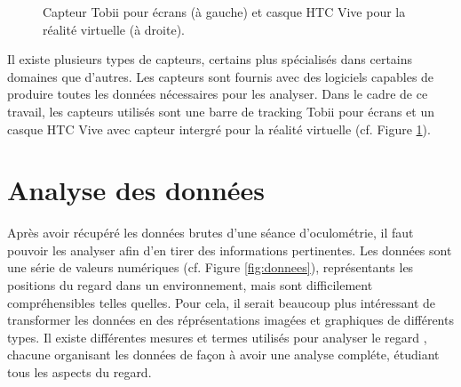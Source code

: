 \documentclass[12pt]{article}
\begin{document}
\begin{figure}[htpb]
  \centering
  \qquad
  \caption{Capteur Tobii \cite{img:tobii} pour écrans (à gauche) et casque HTC
    Vive \cite{img:htcvive} pour la réalité virtuelle (à droite).}
  \label{fig:materiel}
\end{figure}

Il existe plusieurs types de capteurs, certains plus spécialisés dans certains
domaines que d'autres. Les capteurs sont fournis avec des logiciels capables de
produire toutes les données nécessaires pour les analyser. Dans le cadre de ce
travail, les capteurs utilisés sont une barre de tracking Tobii pour écrans et
un casque HTC Vive avec capteur intergré pour la réalité virtuelle (cf. Figure
\ref{fig:materiel}).


\section{Analyse des données}

Après avoir récupéré les données brutes d'une séance d'oculométrie, il faut
pouvoir les analyser afin d'en tirer des informations pertinentes. Les
données sont une série de valeurs numériques (cf. Figure \ref{fig:donnees}),
représentants les positions du regard dans un environnement, mais sont
difficilement compréhensibles telles quelles. Pour cela, il serait beaucoup
plus intéressant de transformer les données en des réprésentations imagées et
graphiques de différents types. Il existe différentes mesures et termes
utilisés pour analyser le regard \cite{imotions:metrics}, chacune organisant
les données de façon à avoir une analyse compléte, étudiant tous les aspects du
regard.
\end{document}
